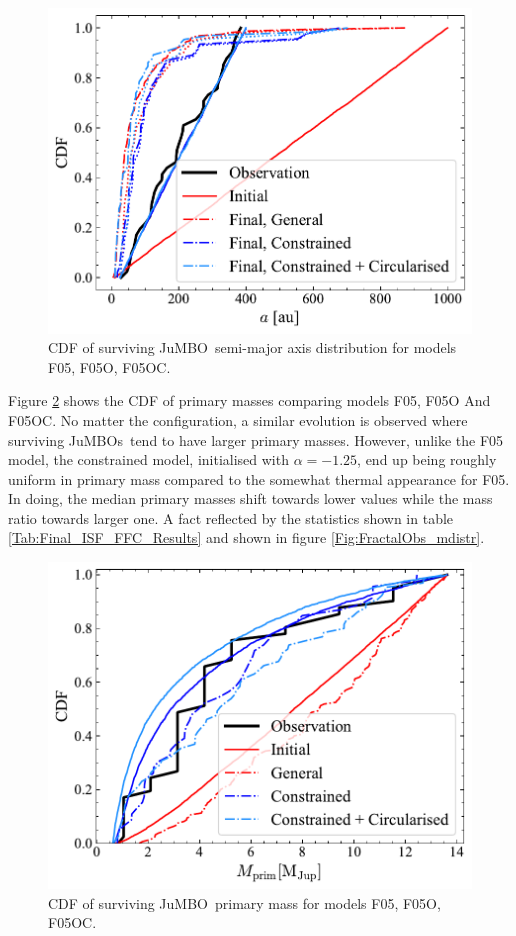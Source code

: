 \documentclass[submission,phys]{lib/SciPost}
\newcommand{\jumbo}{\mbox{JuMBO}}
\newcommand{\jumbos}{\mbox{JuMBOs}}
\begin{document}
   \begin{figure}
    \centering
        \includegraphics[width=\columnwidth]{figures/Fractal_noFF_sem_axis.pdf}
        \caption{CDF of surviving \jumbo\, semi-major axis distribution for models F05, F05O, F05OC.}
         \label{Fig:Semi_Fractal}
   \end{figure}

   Figure \ref{Fig:Fractal_mdistrCDF} shows the CDF of primary masses comparing models F05, F05O And F05OC. No matter the configuration, a similar evolution is observed where surviving \jumbos\, tend to have larger primary masses. However, unlike the F05 model, the constrained model, initialised with $\alpha = -1.25$, end up being roughly uniform in primary mass compared to the somewhat thermal appearance for F05. In doing, the median primary masses shift towards lower values while the mass ratio towards larger one. A fact reflected by the statistics shown in table \ref{Tab:Final_ISF_FFC_Results} and shown in figure \ref{Fig:FractalObs_mdistr}.
    
   \begin{figure}
    \centering
        \includegraphics[width=\columnwidth]{figures/Fractal_noFF_mprim_vs_obs_.pdf}
        \caption{CDF of surviving \jumbo\, primary mass for models F05, F05O, F05OC.}
         \label{Fig:Fractal_mdistrCDF}
   \end{figure}
\end{document}
